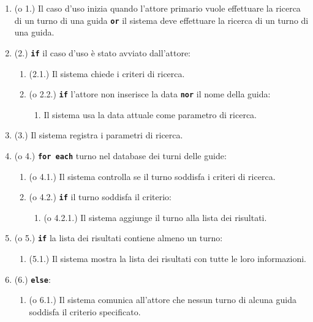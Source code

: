 \documentclass{article}
\begin{document}
		\begin{enumerate}[itemsep=8pt,parsep=0pt]

		\item (o 1.) Il caso d'uso inizia quando l'attore primario vuole effettuare la ricerca di un turno di una guida  \texttt{\textbf{or}} il sistema deve effettuare la ricerca di un turno di una guida.

		\item (2.) \texttt{\textbf{if}} il caso d'uso è stato avviato dall'attore:
			\begin{enumerate}	[leftmargin=28pt]
				\item (2.1.) Il sistema chiede i criteri di ricerca.
				\item (o 2.2.) \texttt{\textbf{if}} l'attore non inserisce la data \texttt{\textbf{nor}} il nome della guida:
					\begin{enumerate}	[leftmargin=28pt]
						\item Il sistema usa la data attuale come parametro di ricerca.
		  			\end{enumerate}	
  			\end{enumerate}	

		\item (3.) Il sistema registra i parametri di ricerca.

		\item (o 4.) \texttt{\textbf{for each}} turno nel database dei turni delle guide:
			\begin{enumerate}	[leftmargin=28pt]
				\item (o 4.1.) Il sistema controlla se il turno soddisfa i criteri di ricerca.
				\item (o 4.2.) \texttt{\textbf{if}} il turno soddisfa il criterio:
					\begin{enumerate}	[leftmargin=28pt]
						\item (o 4.2.1.) Il sistema aggiunge il turno alla lista dei risultati.
		  			\end{enumerate}	
  			\end{enumerate}	

		\item (o 5.) \texttt{\textbf{if}} la lista dei risultati contiene almeno un turno:
			\begin{enumerate}	[leftmargin=28pt]
				\item (5.1.) Il sistema mostra la lista dei risultati con tutte le loro informazioni.
  			\end{enumerate}	

		\item (6.) \texttt{\textbf{else}}:
			\begin{enumerate}	[leftmargin=28pt]
				\item (o 6.1.) Il sistema comunica all'attore che nessun turno di alcuna guida soddisfa il criterio specificato.
  			\end{enumerate}	
		
\end{enumerate}	
	
\end{document}
